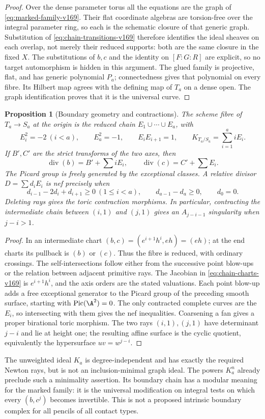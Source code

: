 \documentclass[11pt,reqno]{amsart}
\numberwithin{equation}{section}
\newtheorem{proposition}[theorem]{Proposition}
\theoremstyle{definition}\newtheorem{definition}[theorem]{Definition}
\theoremstyle{remark}\newtheorem{remark}[theorem]{Remark}
\DeclareMathOperator{\Pic}{Pic}\DeclareMathOperator{\diag}{diag}
\begin{document}
\begin{proof}
Over the dense parameter torus all the equations are the graph of
\eqref{eq:marked-family-v169}. Their flat coordinate algebras are
torsion-free over the integral parameter ring, so each is the
schematic closure of that generic graph. Substitution of
\eqref{eq:chain-transitions-v169} therefore identifies the ideal
sheaves on each overlap, not merely their reduced supports: both are
the same closure in the fixed $X$. The substitutions of $b,c$ and the
identity on $[F:G:R]$ are explicit, so no target automorphism is hidden
in this argument. The glued family is projective, flat, and has generic
polynomial $P_a$; connectedness gives that polynomial on every fibre.
Its Hilbert map agrees with the defining map of $T_a$ on a dense open.
The graph identification proves that it is the universal curve.
\end{proof}

\begin{proposition}[Boundary geometry and contractions]\label{prop:boundary-v169}
The scheme fibre of $T_a\to S_a$ at the origin is the reduced chain
$E_1\cup\cdots\cup E_a$, with
\[
 E_i^2=-2\ (i<a),\qquad E_a^2=-1,\qquad
 E_iE_{i+1}=1,
 \qquad K_{T_a/S_a}=\sum_{i=1}^a iE_i.
\]
If $B',C'$ are the strict transforms of the two axes, then
\[
 \operatorname{div}(b)=B'+\sum iE_i,\qquad
 \operatorname{div}(c)=C'+\sum E_i.
\]
The Picard group is freely generated by the exceptional classes. A
relative divisor $D=\sum d_iE_i$ is nef precisely when
\[
 d_{i-1}-2d_i+d_{i+1}\geq0\ (1\leq i<a),\qquad
 d_{a-1}-d_a\geq0,\qquad d_0=0.
\]
Deleting rays gives the toric contraction morphisms. In particular,
contracting the intermediate chain between $(i,1)$ and $(j,1)$ gives
an $A_{j-i-1}$ singularity when $j-i>1$.
\end{proposition}
\begin{proof}
In an intermediate chart $(b,c)=(e^{i+1}h^i,eh)=(eh)$; at the end
charts its pullback is $(b)$ or $(c)$. Thus the fibre is reduced, with
ordinary crossings. The self-intersections follow either from the
successive point blow-ups or the relation between adjacent primitive
rays. The Jacobian in \eqref{eq:chain-charts-v169} is
$e^{i+1}h^i$, and the axis orders are the stated valuations. Each
point blow-up adds a free exceptional generator to the Picard group
of the preceding smooth surface, starting with $\Pic(\A^2)=0$.
The only contracted complete curves are the $E_i$, so intersecting
with them gives the nef inequalities. Coarsening a fan gives a proper
birational toric morphism. The two rays $(i,1),(j,1)$ have determinant
$j-i$ and lie at height one; the resulting affine surface is the
cyclic quotient, equivalently the hypersurface $uv=w^{j-i}$.
\end{proof}
The unweighted ideal $K_a$ is degree-independent and has exactly the
required Newton rays, but is not an inclusion-minimal graph ideal.
The powers $K_a^n$ already preclude such a minimality assertion. Its
boundary chain has a modular meaning for the marked family: it is the
universal modification on integral tests on which every $(b,c^j)$
becomes invertible. This is not a proposed intrinsic boundary complex
for all pencils of all contact types.
\end{document}
